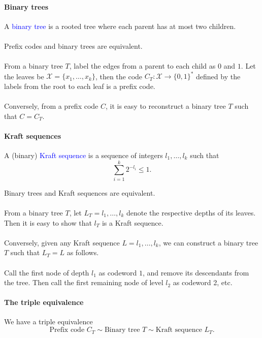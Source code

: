 \documentclass[a4paper, 11pt, openany]{book}
\numberwithin{equation}{section}
\theoremstyle{plain}
\theoremstyle{definition}
\newcommand{\Structure}[1]{\textcolor{blue}{#1}}
\newcommand{\alphabet}[1]{\mathcal{#1}}
\begin{document}
\paragraph{Binary trees}
A \Structure{binary tree} is a rooted tree where each parent has at most two children.\\
~\\
Prefix codes and binary trees are equivalent.\\
~\\
From a binary tree $T$, label the edges from a parent to each child as $0$ and $1$. Let the leaves be $\alphabet{X} = \{x_1, \dots, x_k \}$, then the code $C_T :\alphabet{X} \to \{0,1\}^*$ defined by the labels from the root to each leaf is a prefix code.\\
~\\
Conversely, from a prefix code $C$, it is easy to reconstruct a binary tree $T$ such that $C = C_T$.



\paragraph{Kraft sequences}
A (binary) \Structure{Kraft sequence} is a sequence of integers $l_1, \dots, l_k$ such that 
\[
	\sum_{i=1}^k 2^{-l_i} \le 1.
\]

Binary trees and Kraft sequences are equivalent.\\
~\\
From a binary tree $T$, let $L_T = l_1, \dots, l_k$ denote the respective depths of its leaves. Then it is easy to show that $l_T$ is a Kraft sequence.\\
~\\
Conversely, given any Kraft sequence $L = l_1, \dots, l_k$, we can construct a binary tree $T$ such that $L_T = L$ as follows.\\
~\\
Call the first node of depth $l_1$ as codeword $1$, and remove its descendants from the tree. Then call the first remaining node of level $l_2$ as codeword 2, etc.%


\paragraph{The triple equivalence}

We have a triple equivalence
\[
	\text{Prefix code } C_T \sim \text{Binary tree } T \sim \text{Kraft sequence } L_T.
\]
\end{document}
